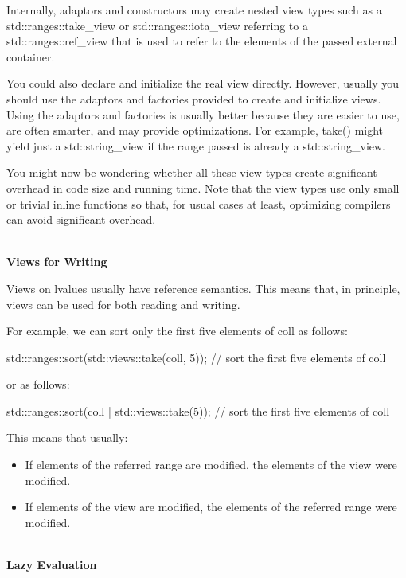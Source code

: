 Internally, adaptors and constructors may create nested view types such as a std::ranges::take\_view or std::ranges::iota\_view referring to a std::ranges::ref\_view that is used to refer to the elements of the passed external container.

You could also declare and initialize the real view directly. However, usually you should use the adaptors and factories provided to create and initialize views. Using the adaptors and factories is usually better because they are easier to use, are often smarter, and may provide optimizations. For example, take() might yield just a std::string\_view if the range passed is already a std::string\_view.

You might now be wondering whether all these view types create significant overhead in code size and running time. Note that the view types use only small or trivial inline functions so that, for usual cases at least, optimizing compilers can avoid significant overhead.

\noindent
\hspace*{\fill} \\ %
\textbf{Views for Writing}

Views on lvalues usually have reference semantics. This means that, in principle, views can be used for both reading and writing.

For example, we can sort only the first five elements of coll as follows:

\begin{cpp}
std::ranges::sort(std::views::take(coll, 5)); // sort the first five elements of coll
\end{cpp}

or as follows:

\begin{cpp}
std::ranges::sort(coll | std::views::take(5)); // sort the first five elements of coll
\end{cpp}

This means that usually:

\begin{itemize}
\item
If elements of the referred range are modified, the elements of the view were modified.

\item
If elements of the view are modified, the elements of the referred range were modified.
\end{itemize}

\noindent
\hspace*{\fill} \\ %
\textbf{Lazy Evaluation}

